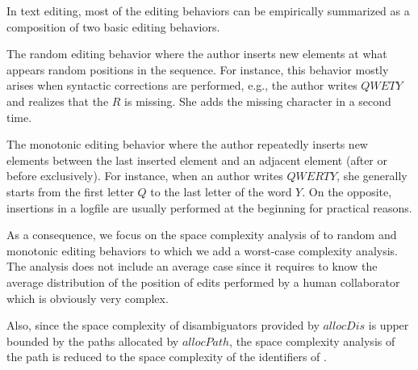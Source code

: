 




In text editing, most of the editing behaviors can be empirically summarized
as a composition of two basic editing behaviors.
\begin{inparaenum}[(i)]
\item The random editing behavior where the author inserts new elements at
  what appears random positions in the sequence. For instance, this behavior
  mostly arises when syntactic corrections are performed, e.g., the author
  writes $QWETY$ and realizes that the $R$ is missing. She adds the missing
  character in a second time.
\item The monotonic editing behavior where the author repeatedly inserts new
  elements between the last inserted element and an adjacent element (after or
  before exclusively). For instance, when an author writes $QWERTY$, she
  generally starts from the first letter $Q$ to the last letter of the word
  $Y$. On the opposite, insertions in a logfile are usually performed at the
  beginning for practical reasons.
\end{inparaenum}

As a consequence, we focus on the space complexity analysis of \LSEQ to
random and monotonic editing behaviors to which we add a worst-case complexity
analysis.  The analysis does not include an average case since it requires to
know the average distribution of the position of edits performed by a human
collaborator which is obviously very complex.

Also, since the space complexity of disambiguators provided by $allocDis$ is
upper bounded by the paths allocated by $allocPath$, the space complexity
analysis of the path is reduced to the space complexity of the identifiers of
\LSEQ.

